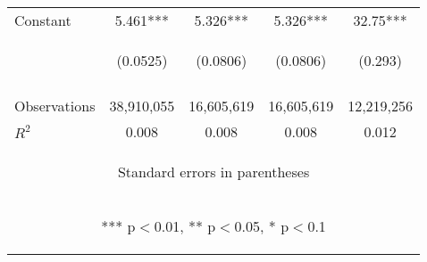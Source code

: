 \begin{table}[htpb!]
\begin{center}
{\begin{tabular}{lcccc}
Constant & 5.461*** & 5.326*** & 5.326*** & 32.75*** \\
 & \begin{footnotesize}(0.0525)\end{footnotesize} & \begin{footnotesize}(0.0806)\end{footnotesize} & \begin{footnotesize}(0.0806)\end{footnotesize} & \begin{footnotesize}(0.293)\end{footnotesize} \\
\vspace{4pt} & \begin{footnotesize}\end{footnotesize} & \begin{footnotesize}\end{footnotesize} & \begin{footnotesize}\end{footnotesize} & \begin{footnotesize}\end{footnotesize} \\
Observations & 38,910,055 & 16,605,619 & 16,605,619 & 12,219,256 \\
 $R^2$ & 0.008 & 0.008 & 0.008 & 0.012 \\ \hline
\multicolumn{5}{c}{\begin{footnotesize} Standard errors in parentheses\end{footnotesize}} \\
\multicolumn{5}{c}{\begin{footnotesize} *** p$<$0.01, ** p$<$0.05, * p$<$0.1\end{footnotesize}} \\
\end{tabular}}
\end{center}
\end{table}

